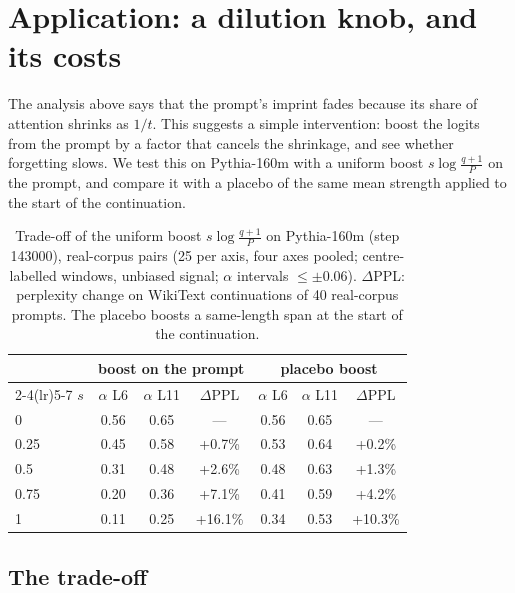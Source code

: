 \documentclass[11pt]{article}
\theoremstyle{definition}
\theoremstyle{remark}
\begin{document}
\section{Application: a dilution knob, and its costs}
\label{sec:application}

The analysis above says that the prompt's imprint fades because its share of attention shrinks as $1/t$. This suggests a simple intervention: boost the logits from the prompt by a factor that cancels the shrinkage, and see whether forgetting slows. We test this on Pythia-160m with a uniform boost $s\log\frac{q+1}{P}$ on the prompt, and compare it with a placebo of the same mean strength applied to the start of the continuation.

\begin{table}[t]
\centering\small
\begin{tabular}{lcccccc}
\toprule
 & \multicolumn{3}{c}{boost on the prompt} & \multicolumn{3}{c}{placebo boost} \\
\cmidrule(lr){2-4}\cmidrule(lr){5-7}
$s$ & $\alpha$ L6 & $\alpha$ L11 & $\Delta$PPL & $\alpha$ L6 & $\alpha$ L11 & $\Delta$PPL \\
\midrule
0    & 0.56 & 0.65 & --- & 0.56 & 0.65 & --- \\
0.25 & 0.45 & 0.58 & +0.7\% & 0.53 & 0.64 & +0.2\% \\
0.5  & 0.31 & 0.48 & +2.6\% & 0.48 & 0.63 & +1.3\% \\
0.75 & 0.20 & 0.36 & +7.1\% & 0.41 & 0.59 & +4.2\% \\
1    & 0.11 & 0.25 & +16.1\% & 0.34 & 0.53 & +10.3\% \\
\bottomrule
\end{tabular}
\caption{Trade-off of the uniform boost $s\log\frac{q+1}{P}$ on Pythia-160m (step 143000), real-corpus pairs (25 per axis, four axes pooled; centre-labelled windows, unbiased signal; $\alpha$ intervals $\le\pm0.06$). $\Delta$PPL: perplexity change on WikiText continuations of 40 real-corpus prompts. The placebo boosts a same-length span at the start of the continuation.}
\label{tab:tradeoff}
\end{table}

\subsection{The trade-off}
\label{sec:app-tradeoff}
\end{document}
